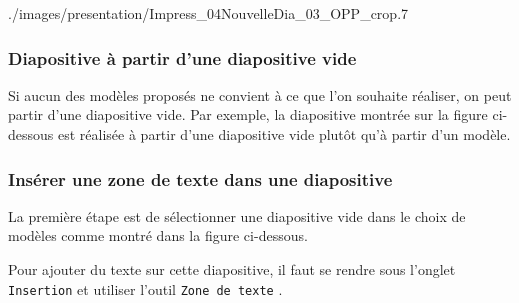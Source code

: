 	      {./images/presentation/Impress_04NouvelleDia_03_OPP_crop}{.7\textwidth}



\subsubsection{Diapositive à partir d'une diapositive vide}\label{Presentation1DiapoSansModele}


Si aucun des modèles proposés ne convient à ce que l'on souhaite réaliser, on peut partir d'une diapositive vide. Par exemple, la diapositive montrée sur la figure ci-dessous est réalisée à partir d'une diapositive vide plutôt qu'à partir d'un modèle.



\subsubsection{Insérer une zone de texte dans une diapositive}\label{Presentation1texte}


\vspace{1em}

La première étape est de sélectionner une diapositive vide dans le choix de modèles comme montré dans la figure ci-dessous.




Pour ajouter du texte sur cette diapositive, il faut se rendre sous l'onglet \texttt{Insertion}  et utiliser l'outil \texttt{Zone de texte} .


